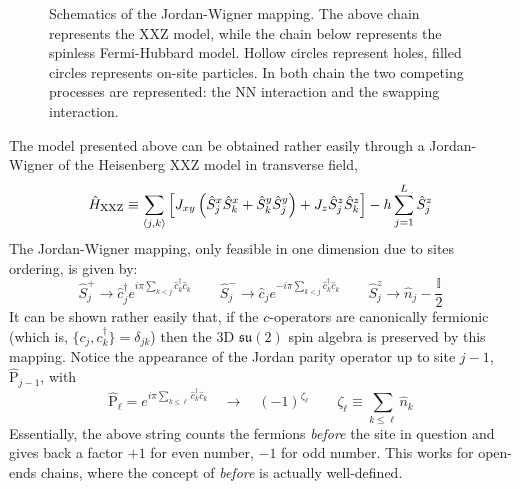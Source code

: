 \begin{figure}
	\centering
	
	\caption{Schematics of the Jordan-Wigner mapping. The above chain represents the $\mathrm{XXZ}$ model, while the chain below represents the spinless Fermi-Hubbard model. Hollow circles represent holes, filled circles represents on-site particles. In both chain the two competing processes are represented: the NN interaction and the swapping interaction.}
	\label{fig:jordan-wigner-mapping}
\end{figure}

The model presented above can be obtained rather easily through a Jordan-Wigner of the Heisenberg XXZ model in transverse field,
\begin{equation}\label{eq:xxz-hamiltonian}
	\hat H_\mathrm{XXZ} \equiv \sum_{\ev{j,k}} \left[
		J_{xy} \left( 
			\hat S_j^x \hat S_k^x + \hat S_k^y \hat S_j^y
		\right) + J_z \hat S_j^z \hat S_k^z
	\right] - h \sum_{j=1}^L \hat S_j^z 
\end{equation}
The Jordan-Wigner mapping, only feasible in one dimension due to sites ordering, is given by:
\[
	\hat S_j^+ \to \hat c_j^\dagger e^{i\pi \sum_{k < j} \hat c_k^\dagger \hat c_k}
	\qquad
	\hat S_j^- \to \hat c_j e^{- i\pi \sum_{k < j} \hat c_k^\dagger \hat c_k}
	\qquad
	\hat S_j^z \to \hat n_j - \frac{\mathbb{I}}{2}
\]
It can be shown rather easily that, if the $c$-operators are canonically fermionic (which is, $\lbrace c_j, c_k^\dagger \rbrace = \delta_{jk}$) then the $3$D $\mathfrak{su}(2)$ spin algebra is preserved by this mapping. Notice the appearance of the Jordan parity operator up to site $j-1$, $\hat{\mathrm{P}}_{j-1}$, with
\[
	\hat{\mathrm{P}}_\ell = e^{i\pi \sum_{k \le \ell} \hat c_k^\dagger \hat c_k}
	\quad\to\quad
	(-1)^{\zeta_\ell}
	\qquad
	\zeta_\ell \equiv \sum_{k \le \ell} \hat n_k
\]
Essentially, the above string counts the fermions \textit{before} the site in question and gives back a factor $+1$ for even number, $-1$ for odd number. This works for open-ends chains, where the concept of \textit{before} is actually well-defined. 

